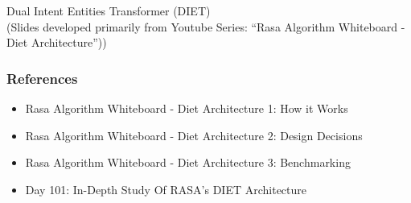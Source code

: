 \begin{frame}[fragile]\frametitle{}
\begin{center}
{\Large Dual Intent Entities Transformer (DIET)}\\

{\tiny (Slides developed primarily from Youtube Series: ``Rasa Algorithm Whiteboard - Diet Architecture''))}

\end{center}
\end{frame}

\begin{frame}[fragile]\frametitle{References}
		\begin{itemize}
		\item Rasa Algorithm Whiteboard - Diet Architecture 1: How it Works
		\item Rasa Algorithm Whiteboard - Diet Architecture 2: Design Decisions
		\item Rasa Algorithm Whiteboard - Diet Architecture 3: Benchmarking
		\item Day 101: In-Depth Study Of RASA’s DIET Architecture
		\end{itemize}
\end{frame}






